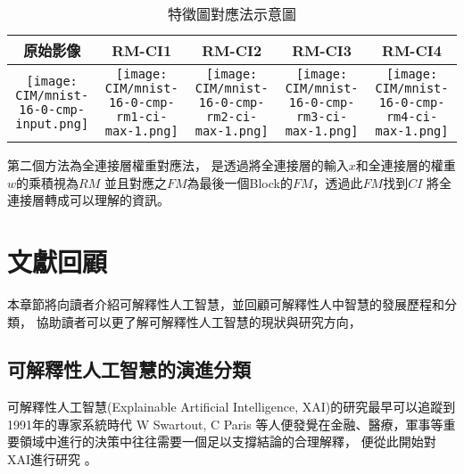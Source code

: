 \documentclass[class=NCU_thesis, crop=false]{standalone}
\begin{document}
\begin{table}[H]
  \centering
  \begin{tabular}{| c | c | c | c | c |}
    \hline
    原始影像 & RM-CI1 & RM-CI2 & RM-CI3 & RM-CI4 \\
    \hline
    \begin{minipage}[t]{0.18\columnwidth}\centering\texttt{[image: CIM/mnist-16-0-cmp-input.png]}\end{minipage} &
    \begin{minipage}[t]{0.18\columnwidth}\centering\texttt{[image: CIM/mnist-16-0-cmp-rm1-ci-max-1.png]}\end{minipage} &
    \begin{minipage}[t]{0.18\columnwidth}\centering\texttt{[image: CIM/mnist-16-0-cmp-rm2-ci-max-1.png]}\end{minipage} &
    \begin{minipage}[t]{0.18\columnwidth}\centering\texttt{[image: CIM/mnist-16-0-cmp-rm3-ci-max-1.png]}\end{minipage} &
    \begin{minipage}[t]{0.18\columnwidth}\centering\texttt{[image: CIM/mnist-16-0-cmp-rm4-ci-max-1.png]}\end{minipage} 
    \\ \hline
    \end{tabular}
    \caption{特徵圖對應法示意圖\cite{YangCNNInterpretable}}
    \label{tab:CIM_RMCI_example}
\end{table}

第二個方法為全連接層權重對應法，
是透過將全連接層的輸入$x$和全連接層的權重$w$的乘積視為$RM$
並且對應之$FM$為最後一個Block的$FM$，透過此$FM$找到$CI$
將全連接層轉成可以理解的資訊。

\section{文獻回顧}

本章節將向讀者介紹可解釋性人工智慧，並回顧可解釋性人中智慧的發展歷程和分類，
協助讀者可以更了解可解釋性人工智慧的現狀與研究方向，


\subsection{可解釋性人工智慧的演進分類}
可解釋性人工智慧(Explainable Artificial Intelligence, XAI)的研究最早可以追蹤到1991年的專家系統時代 W Swartout, C Paris 等人便發覺在金融、醫療，軍事等重要領域中進行的決策中往往需要一個足以支撐結論的合理解釋，
便從此開始對XAI進行研究 \cite{87686}。
\end{document}

